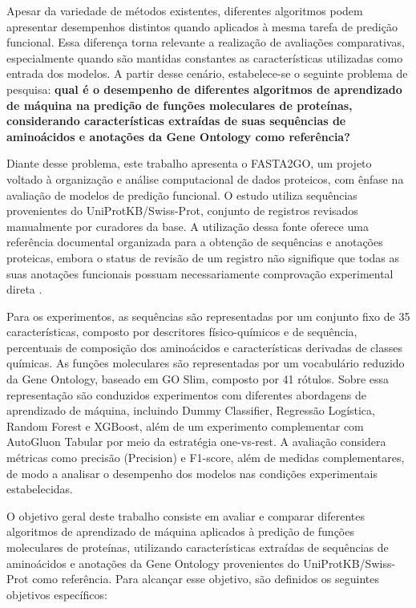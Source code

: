 Apesar da variedade de métodos existentes, diferentes algoritmos podem apresentar desempenhos distintos quando aplicados à mesma tarefa de predição funcional. Essa diferença torna relevante a realização de avaliações comparativas, especialmente quando são mantidas constantes as características utilizadas como entrada dos modelos. A partir desse cenário, estabelece-se o seguinte problema de pesquisa: \textbf{qual é o desempenho de diferentes algoritmos de aprendizado de máquina na predição de funções moleculares de proteínas, considerando características extraídas de suas sequências de aminoácidos e anotações da Gene Ontology como referência?}

Diante desse problema, este trabalho apresenta o FASTA2GO, um projeto voltado à organização e análise computacional de dados proteicos, com ênfase na avaliação de modelos de predição funcional. O estudo utiliza sequências provenientes do UniProtKB/Swiss-Prot, conjunto de registros revisados manualmente por curadores da base. A utilização dessa fonte oferece uma referência documental organizada para a obtenção de sequências e anotações proteicas, embora o status de revisão de um registro não signifique que todas as suas anotações funcionais possuam necessariamente comprovação experimental direta \cite{uniprot2025}.

Para os experimentos, as sequências são representadas por um conjunto fixo de 35 características, composto por descritores físico-químicos e de sequência, percentuais de composição dos aminoácidos e características derivadas de classes químicas. As funções moleculares são representadas por um vocabulário reduzido da Gene Ontology, baseado em GO Slim, composto por 41 rótulos. Sobre essa representação são conduzidos experimentos com diferentes abordagens de aprendizado de máquina, incluindo Dummy Classifier, Regressão Logística, Random Forest e XGBoost, além de um experimento complementar com AutoGluon Tabular por meio da estratégia one-vs-rest. A avaliação considera métricas como precisão (Precision) e F1-score, além de medidas complementares, de modo a analisar o desempenho dos modelos nas condições experimentais estabelecidas.

O objetivo geral deste trabalho consiste em avaliar e comparar diferentes algoritmos de aprendizado de máquina aplicados à predição de funções moleculares de proteínas, utilizando características extraídas de sequências de aminoácidos e anotações da Gene Ontology provenientes do UniProtKB/Swiss-Prot como referência. Para alcançar esse objetivo, são definidos os seguintes objetivos específicos:

